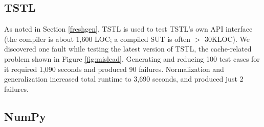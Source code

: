 \subsection{TSTL}

As noted in Section \ref{freshgen}, TSTL is used to test TSTL's own
API interface (the compiler is about 1,600 LOC; a compiled SUT is
often $>$ 30KLOC).  We discovered one fault while testing
the latest version of TSTL, the cache-related problem shown in Figure \ref{fig:mislead}.
Generating and reducing 100 test cases for it required 1,090 seconds
and produced 90 failures.  Normalization and generalization
increased total runtime to 3,690 seconds, and produced just 2
failures.

\subsection{NumPy}

